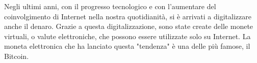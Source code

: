 Negli ultimi anni, con il progresso tecnologico e con l'aumentare del coinvolgimento di Internet nella nostra quotidianità, si è arrivati a digitalizzare anche il denaro. Grazie a questa digitalizzazione, sono state create delle monete virtuali, o valute elettroniche, che possono essere utilizzate solo su Internet. La moneta elettronica che ha lanciato questa "tendenza" è una delle più famose, il Bitcoin. \\